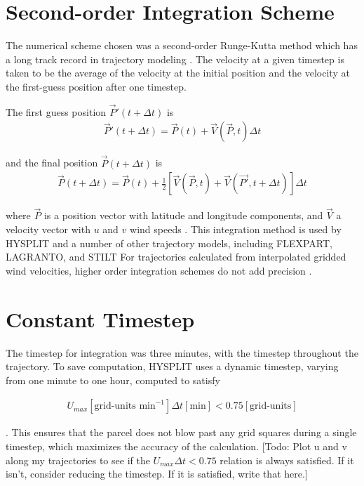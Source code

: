 \section{Second-order Integration Scheme}
The numerical scheme chosen was a second-order Runge-Kutta method which has a long track record in trajectory modeling \cite{petterssen_weather_1940}.
The velocity at a given timestep is taken to be the average of the velocity at the initial position and the velocity at the first-guess position after one timestep.

The first guess position $\vec{P}' (t + \Delta t)$ is 
\begin{align}
    \vec{P}' (t + \Delta t) = \vec{P}(t) + \vec{V} (\vec{P}, t) \Delta t
\end{align}

and the final position $\vec{P} (t + \Delta t)$ is
\begin{align}
    \vec{P} (t + \Delta t) = \vec{P} (t) + \frac{1}{2} \left [ \vec{V} (\vec{P}, t) + \vec{V} (\vec{P'}, t + \Delta t) \right ] \Delta t
\end{align}

where $\vec{P}$ is a position vector with latitude and longitude components, and $\vec{V}$ a velocity vector with $u$ and $v$ wind speeds \cite{draxler_description_1997}.
This integration method is used by HYSPLIT and a number of other trajectory models, including FLEXPART, LAGRANTO, and STILT \cite{bowman_input_2013, stein_noaas_2015} 
For trajectories calculated from interpolated gridded wind velocities, higher order integration schemes do not add precision \cite{draxler_description_1997}.  

\section{Constant Timestep}
The timestep for integration was three minutes, with the timestep throughout the trajectory. 
To save computation, HYSPLIT uses a dynamic timestep, varying from one minute to one hour, computed to satisfy

\begin{align}
    U_{max} [\text{grid-units min}^{-1}] \Delta t [\text{min}] < 0.75 [\text{grid-units}] 
\end{align}

\cite{draxler_description_1997}. This ensures that the parcel does not blow past any grid squares during a single timestep, which maximizes the accuracy of the calculation. 
[Todo: Plot u and v along my trajectories to see if the $U_{max} \Delta t < 0.75$ relation is always satisfied. If it isn't, consider reducing the timestep. If it is satisfied, write that here.]

